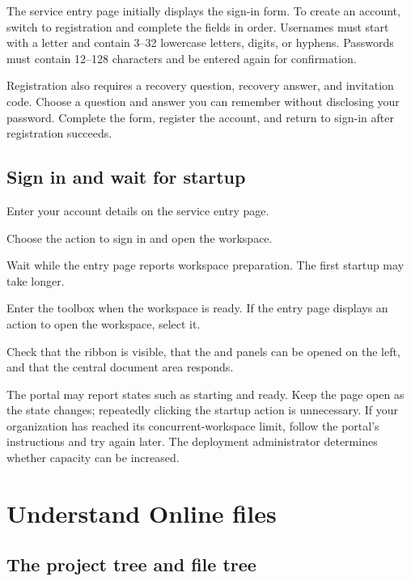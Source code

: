 The service entry page initially displays the sign-in form. To create an account, switch to registration and complete the fields in order. Usernames must start with a letter and contain 3--32 lowercase letters, digits, or hyphens. Passwords must contain 12--128 characters and be entered again for confirmation.

Registration also requires a recovery question, recovery answer, and invitation code. Choose a question and answer you can remember without disclosing your password. Complete the form, register the account, and return to sign-in after registration succeeds.

\subsection{Sign in and wait for startup}

\begin{steps}
\item Enter your account details on the service entry page.
\item Choose the action to sign in and open the workspace.
\item Wait while the entry page reports workspace preparation. The first startup may take longer.
\item Enter the toolbox when the workspace is ready. If the entry page displays an action to open the workspace, select it.
\item Check that the ribbon is visible, that the  and  panels can be opened on the left, and that the central document area responds.
\end{steps}

The portal may report states such as starting and ready. Keep the page open as the state changes; repeatedly clicking the startup action is unnecessary. If your organization has reached its concurrent-workspace limit, follow the portal's instructions and try again later. The deployment administrator determines whether capacity can be increased.

\section{Understand Online files}

\subsection{The project tree and file tree}

